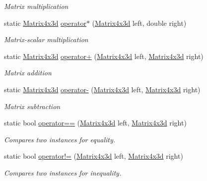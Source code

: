 \begin{DoxyCompactItemize}
\begin{DoxyCompactList}\small\item\em Matrix multiplication \end{DoxyCompactList}\item 
static \hyperlink{struct_open_t_k_1_1_matrix4x3d}{Matrix4x3d} \hyperlink{struct_open_t_k_1_1_matrix4x3d_a207baa707e60cd51a0116deba2cf5c5b}{operator$\ast$} (\hyperlink{struct_open_t_k_1_1_matrix4x3d}{Matrix4x3d} left, double right)
\begin{DoxyCompactList}\small\item\em Matrix-\/scalar multiplication \end{DoxyCompactList}\item 
static \hyperlink{struct_open_t_k_1_1_matrix4x3d}{Matrix4x3d} \hyperlink{struct_open_t_k_1_1_matrix4x3d_ad3fba58933fc13eaaa9be631ed28467f}{operator+} (\hyperlink{struct_open_t_k_1_1_matrix4x3d}{Matrix4x3d} left, \hyperlink{struct_open_t_k_1_1_matrix4x3d}{Matrix4x3d} right)
\begin{DoxyCompactList}\small\item\em Matrix addition \end{DoxyCompactList}\item 
static \hyperlink{struct_open_t_k_1_1_matrix4x3d}{Matrix4x3d} \hyperlink{struct_open_t_k_1_1_matrix4x3d_a03fd131cdef8592860a9e16b5c595628}{operator-\/} (\hyperlink{struct_open_t_k_1_1_matrix4x3d}{Matrix4x3d} left, \hyperlink{struct_open_t_k_1_1_matrix4x3d}{Matrix4x3d} right)
\begin{DoxyCompactList}\small\item\em Matrix subtraction \end{DoxyCompactList}\item 
static bool \hyperlink{struct_open_t_k_1_1_matrix4x3d_a18e7a337e7e91a09e6812adfb35680c3}{operator==} (\hyperlink{struct_open_t_k_1_1_matrix4x3d}{Matrix4x3d} left, \hyperlink{struct_open_t_k_1_1_matrix4x3d}{Matrix4x3d} right)
\begin{DoxyCompactList}\small\item\em Compares two instances for equality. \end{DoxyCompactList}\item 
static bool \hyperlink{struct_open_t_k_1_1_matrix4x3d_aa86aaf5feaa5fc9be791900d4ffa36fe}{operator!=} (\hyperlink{struct_open_t_k_1_1_matrix4x3d}{Matrix4x3d} left, \hyperlink{struct_open_t_k_1_1_matrix4x3d}{Matrix4x3d} right)
\begin{DoxyCompactList}\small\item\em Compares two instances for inequality. \end{DoxyCompactList}\end{DoxyCompactItemize}
